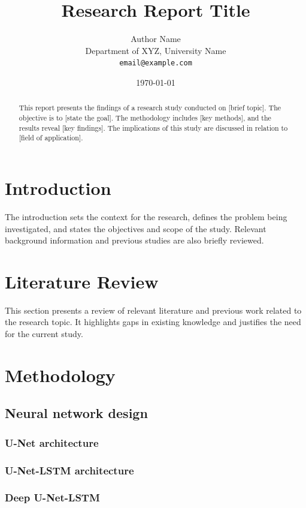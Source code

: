 \documentclass[12pt,a4paper]{article}
\title{Research Report Title}
\author{Author Name \\
	\small Department of XYZ, University Name \\
	\small \texttt{email@example.com}}
\date{\today}
\begin{document}
	
	\maketitle
	
	\begin{abstract}
		This report presents the findings of a research study conducted on [brief topic]. The objective is to [state the goal]. The methodology includes [key methods], and the results reveal [key findings]. The implications of this study are discussed in relation to [field of application].
	\end{abstract}
	
	\tableofcontents
	\newpage
	
	
	\section{Introduction}
	The introduction sets the context for the research, defines the problem being investigated, and states the objectives and scope of the study. Relevant background information and previous studies are also briefly reviewed.
	
	\section{Literature Review}
	This section presents a review of relevant literature and previous work related to the research topic. It highlights gaps in existing knowledge and justifies the need for the current study.
	
	\section{Methodology}
	\subsection{Neural network design}
		\subsubsection{U-Net architecture}
		\subsubsection{U-Net-LSTM architecture}
		\subsubsection{Deep U-Net-LSTM}
	
\end{document}
